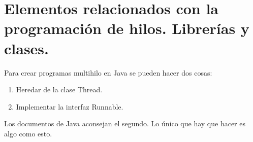 \documentclass[a4paper,12pt,spanish]{sphinxmanual}
\begin{document}
\section{Elementos relacionados con la programación de hilos. Librerías y clases.}
\label{textos/tema2:elementos-relacionados-con-la-programacion-de-hilos-librerias-y-clases}
Para crear programas multihilo en Java se pueden hacer dos cosas:
\begin{enumerate}
\item {} 
Heredar de la clase Thread.

\item {} 
Implementar la interfaz Runnable.

\end{enumerate}

Los documentos de Java aconsejan el segundo. Lo único que hay que hacer es algo como esto.
\end{document}
